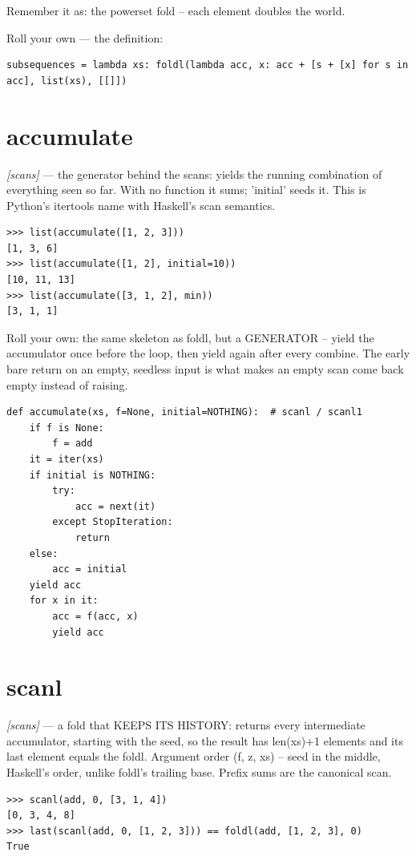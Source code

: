 \documentclass[11pt,letterpaper]{book}
\begin{document}
Remember it as: the powerset fold -- each element doubles the world.


Roll your own --- the definition:

\begin{lstlisting}[style=code]
subsequences = lambda xs: foldl(lambda acc, x: acc + [s + [x] for s in acc], list(xs), [[]])
\end{lstlisting}

\section{accumulate}
\noindent\textit{[scans]} --- the generator behind the scans: yields the running combination of everything seen so far. With no function it sums; 'initial' seeds it. This is Python's itertools name with Haskell's scan semantics.
\begin{lstlisting}[style=spec]
>>> list(accumulate([1, 2, 3]))
[1, 3, 6]
>>> list(accumulate([1, 2], initial=10))
[10, 11, 13]
>>> list(accumulate([3, 1, 2], min))
[3, 1, 1]
\end{lstlisting}

Roll your own: the same skeleton as foldl, but a GENERATOR -- yield the accumulator once before the loop, then yield again after every combine. The early bare return on an empty, seedless input is what makes an empty scan come back empty instead of raising.

\begin{lstlisting}[style=code]
def accumulate(xs, f=None, initial=NOTHING):  # scanl / scanl1
    if f is None:
        f = add
    it = iter(xs)
    if initial is NOTHING:
        try:
            acc = next(it)
        except StopIteration:
            return
    else:
        acc = initial
    yield acc
    for x in it:
        acc = f(acc, x)
        yield acc
\end{lstlisting}

\section{scanl}
\noindent\textit{[scans]} --- a fold that KEEPS ITS HISTORY: returns every intermediate accumulator, starting with the seed, so the result has len(xs)+1 elements and its last element equals the foldl. Argument order (f, z, xs) -- seed in the middle, Haskell's order, unlike foldl's trailing base. Prefix sums are the canonical scan.
\begin{lstlisting}[style=spec]
>>> scanl(add, 0, [3, 1, 4])
[0, 3, 4, 8]
>>> last(scanl(add, 0, [1, 2, 3])) == foldl(add, [1, 2, 3], 0)
True
\end{lstlisting}
\end{document}
